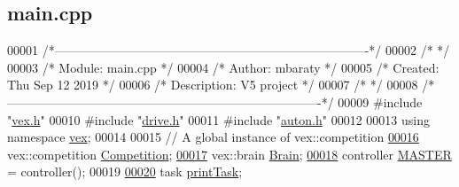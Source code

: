 \hypertarget{main_8cpp_source}{}\subsection{main.\+cpp}
\label{main_8cpp_source}

\begin{DoxyCode}
00001 \textcolor{comment}{/*----------------------------------------------------------------------------*/}
00002 \textcolor{comment}{/*                                                                            */}
00003 \textcolor{comment}{/*    Module:       main.cpp                                                  */}
00004 \textcolor{comment}{/*    Author:       mbaraty                                                   */}
00005 \textcolor{comment}{/*    Created:      Thu Sep 12 2019                                           */}
00006 \textcolor{comment}{/*    Description:  V5 project                                                */}
00007 \textcolor{comment}{/*                                                                            */}
00008 \textcolor{comment}{/*----------------------------------------------------------------------------*/}
00009 \textcolor{preprocessor}{#include "\mbox{\hyperlink{vex_8h}{vex.h}}"}
00010 \textcolor{preprocessor}{#include "\mbox{\hyperlink{drive_8h}{drive.h}}"}
00011 \textcolor{preprocessor}{#include "\mbox{\hyperlink{auton_8h}{auton.h}}"}
00012 
00013 \textcolor{keyword}{using namespace }\mbox{\hyperlink{namespacevex}{vex}};
00014 
00015 \textcolor{comment}{// A global instance of vex::competition}
\mbox{\hyperlink{main_8cpp_ae38c1d025caf302610a55e0a7a9db5dd_ae38c1d025caf302610a55e0a7a9db5dd}{00016}} vex::competition \mbox{\hyperlink{main_8cpp_ae38c1d025caf302610a55e0a7a9db5dd_ae38c1d025caf302610a55e0a7a9db5dd}{Competition}};
\mbox{\hyperlink{main_8cpp_a4918ae1421e0a76946a52104b80cd8b8_a4918ae1421e0a76946a52104b80cd8b8}{00017}} vex::brain \mbox{\hyperlink{main_8cpp_a4918ae1421e0a76946a52104b80cd8b8_a4918ae1421e0a76946a52104b80cd8b8}{Brain}};
\mbox{\hyperlink{main_8cpp_ab04f8ff803f7f02c23e713402e13bf32_ab04f8ff803f7f02c23e713402e13bf32}{00018}} controller \mbox{\hyperlink{main_8cpp_ab04f8ff803f7f02c23e713402e13bf32_ab04f8ff803f7f02c23e713402e13bf32}{MASTER}} = controller();
00019 
\mbox{\hyperlink{main_8cpp_aa8d8e260e2268c61bbbf2017f3f6ad92_aa8d8e260e2268c61bbbf2017f3f6ad92}{00020}} task \mbox{\hyperlink{main_8cpp_aa8d8e260e2268c61bbbf2017f3f6ad92_aa8d8e260e2268c61bbbf2017f3f6ad92}{printTask}};

\end{DoxyCode}
